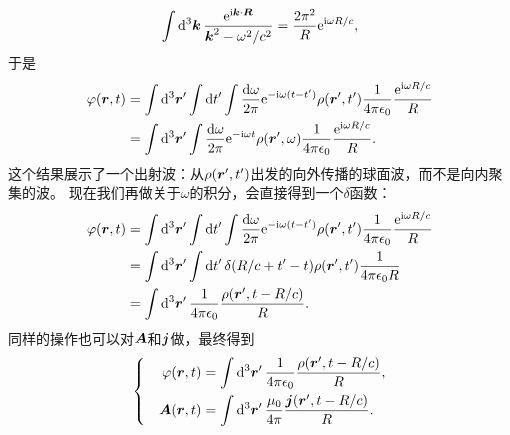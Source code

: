 \documentclass[UTF8, a4paper]{ctexart}
\newcommand*{\ee}{\mathrm{e}}
\newcommand*{\ii}{\mathrm{i}}
\newenvironment{bigcase}{\left\{\quad\begin{aligned}}{\end{aligned}\right.}
\begin{document}
\[
    \int \dd[3]{\vb*{k}} \frac{\ee^{\ii \vb*{k} \cdot \vb*{R}}}{\vb*{k}^2 - \omega^2/c^2} = \frac{2 \pi^2}{R} \ee^{\ii \omega R / c}, 
\]
于是
\begin{equation}
    \begin{aligned}
        \varphi(\vb*{r}, t) &= \int \dd[3]{\vb*{r}'} \int \dd{t'} \int \frac{\dd{\omega}}{2\pi} \ee^{-\ii \omega (t-t')} \rho(\vb*{r}', t') \frac{1}{4\pi \epsilon_0} \frac{\ee^{\ii \omega R / c}}{R} \\
        &= \int \dd[3]{\vb*{r}'} \int \frac{\dd{\omega}}{2\pi} \ee^{- \ii \omega t} \rho(\vb*{r}', \omega) \frac{1}{4\pi \epsilon_0} \frac{\ee^{\ii \omega R / c}}{R}.
    \end{aligned}
\end{equation}
这个结果展示了一个出射波：从$\rho(\vb*{r}', t')$出发的向外传播的球面波，而不是向内聚集的波。
现在我们再做关于$\omega$的积分，会直接得到一个$\delta$函数：
\[
    \begin{aligned}
        \varphi(\vb*{r}, t) &= \int \dd[3]{\vb*{r}'} \int \dd{t'} \int \frac{\dd{\omega}}{2\pi} \ee^{-\ii \omega (t-t')} \rho(\vb*{r}', t') \frac{1}{4\pi \epsilon_0} \frac{\ee^{\ii \omega R / c}}{R} \\
        &= \int \dd[3]{\vb*{r}'} \int \dd{t'} \delta(R/c + t' - t) \rho(\vb*{r}', t') \frac{1}{4\pi \epsilon_0 R} \\
        &= \int \dd[3]{\vb*{r}'} \frac{1}{4\pi \epsilon_0} \frac{\rho(\vb*{r}', t - R / c)}{R}.
    \end{aligned}
\]
同样的操作也可以对$\vb*{A}$和$\vb*{j}$做，最终得到
\begin{equation}
    \begin{bigcase}
        \varphi(\vb*{r}, t) &= \int \dd[3]{\vb*{r}'} \frac{1}{4\pi \epsilon_0} \frac{\rho(\vb*{r}', t - R / c)}{R}, \\
        \vb*{A}(\vb*{r}, t) &= \int \dd[3]{\vb*{r}'} \frac{\mu_0}{4\pi} \frac{\vb*{j}(\vb*{r}', t - R / c)}{R}.
    \end{bigcase}
    \label{eq:general-solution-wave}
\end{equation}
\end{document}
